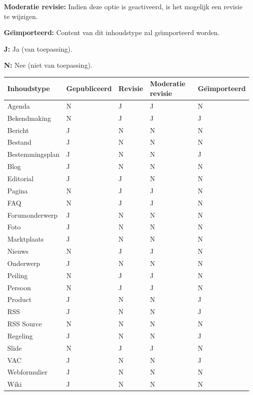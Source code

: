 \textbf{Moderatie revisie:} Indien deze optie is geactiveerd, is het mogelijk een revisie te wijzigen.

\textbf{Ge{\"\i}mporteerd:} Content van dit inhoudstype zal ge{\"\i}mporteerd worden.

\textbf{J:} Ja (van toepassing).

\textbf{N:} Nee (niet van toepassing).

\begin{tabularx}{\textwidth}{ | p{5cm} |X|X|X|X| }
  \hline
  Inhoudstype & Gepubliceerd & Revisie & Moderatie revisie & Ge{\"\i}mporteerd \\ \hline
  Agenda & N & J  & J & N  \\ \hline
  Bekendmaking & N & J  & J & J  \\ \hline
  Bericht  & J & N  & N & N  \\ \hline
  Bestand  & J & N  & N & N  \\ \hline
  Bestemmingsplan  & J & N  & N & J  \\ \hline
  Blog  & J & N  & N & N  \\ \hline
  Editorial  & J & J  & N & N  \\ \hline
  Pagina  & N & J  & J & N  \\ \hline
  FAQ  & N & J  & J & N  \\ \hline
  Forumonderwerp  & J & N  & N & N  \\ \hline
  Foto  & J & N  & N & N  \\ \hline
  Marktplaats  & J & N  & N & N  \\ \hline
  Nieuws  & N & J  & J & N  \\ \hline
  Onderwerp  & J & N  & N & N  \\ \hline
  Peiling  & N & J  & J & N  \\ \hline
  Persoon  & N & J  & J & N  \\ \hline
  Product  & J & N  & N & J  \\ \hline
  RSS  & J & N  & N & J  \\ \hline
  RSS Source  & N & N  & N & N  \\ \hline
  Regeling  & J & N  & N & J  \\ \hline
  Slide  & N & J  & J & N  \\ \hline
  VAC  & J & N  & N & J  \\ \hline
  Webformulier  & J & N  & N & N  \\ \hline
  Wiki  & J & N  & N & N  \\ \hline
\end{tabularx}

